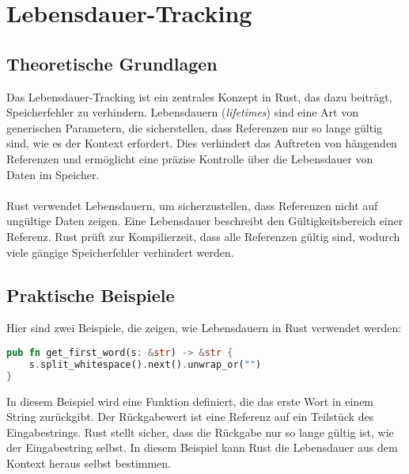 \chapter{Lebensdauer-Tracking}

\section{Theoretische Grundlagen}
Das Lebensdauer-Tracking ist ein zentrales Konzept in Rust, das dazu beiträgt, Speicherfehler zu verhindern. 
Lebensdauern (\emph{lifetimes}) sind eine Art von generischen Parametern, die sicherstellen, dass Referenzen nur so lange gültig sind, wie es der Kontext erfordert. 
Dies verhindert das Auftreten von hängenden Referenzen und ermöglicht eine präzise Kontrolle über die Lebensdauer von Daten im Speicher.\\
\\
Rust verwendet Lebensdauern, um sicherzustellen, dass Referenzen nicht auf ungültige Daten zeigen. Eine Lebensdauer beschreibt den Gültigkeitsbereich einer Referenz. 
Rust prüft zur Kompilierzeit, dass alle Referenzen gültig sind, wodurch viele gängige Speicherfehler verhindert werden.

\section{Praktische Beispiele}
Hier sind zwei Beispiele, die zeigen, wie Lebensdauern in Rust verwendet werden:

\begin{lstlisting}[language=Rust, caption={Impliziete lifetime}]
pub fn get_first_word(s: &str) -> &str {
    s.split_whitespace().next().unwrap_or("")
}
\end{lstlisting}
\noindent
In diesem Beispiel wird eine Funktion definiert, die das erste Wort in einem String zurückgibt. 
Der Rückgabewert ist eine Referenz auf ein Teilstück des Eingabestrings.
Rust stellt sicher, dass die Rückgabe nur so lange gültig ist, wie der Eingabestring selbst.
In diesem Beispiel kann Rust die Lebensdauer aus dem Kontext heraus selbst bestimmen.

